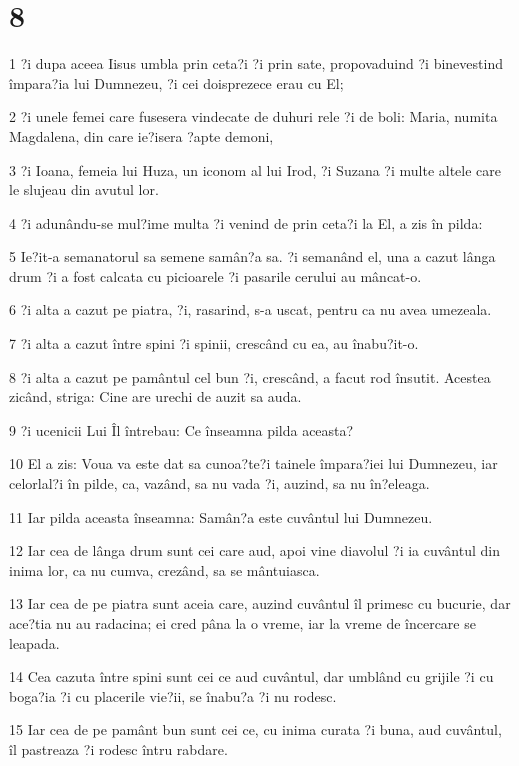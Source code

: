 \chapter{8}

\par 1 ?i dupa aceea Iisus umbla prin ceta?i ?i prin sate, propovaduind ?i binevestind împara?ia lui Dumnezeu, ?i cei doisprezece erau cu El;
\par 2 ?i unele femei care fusesera vindecate de duhuri rele ?i de boli: Maria, numita Magdalena, din care ie?isera ?apte demoni,
\par 3 ?i Ioana, femeia lui Huza, un iconom al lui Irod, ?i Suzana ?i multe altele care le slujeau din avutul lor.
\par 4 ?i adunându-se mul?ime multa ?i venind de prin ceta?i la El, a zis în pilda:
\par 5 Ie?it-a semanatorul sa semene samân?a sa. ?i semanând el, una a cazut lânga drum ?i a fost calcata cu picioarele ?i pasarile cerului au mâncat-o.
\par 6 ?i alta a cazut pe piatra, ?i, rasarind, s-a uscat, pentru ca nu avea umezeala.
\par 7 ?i alta a cazut între spini ?i spinii, crescând cu ea, au înabu?it-o.
\par 8 ?i alta a cazut pe pamântul cel bun ?i, crescând, a facut rod însutit. Acestea zicând, striga: Cine are urechi de auzit sa auda.
\par 9 ?i ucenicii Lui Îl întrebau: Ce înseamna pilda aceasta?
\par 10 El a zis: Voua va este dat sa cunoa?te?i tainele împara?iei lui Dumnezeu, iar celorlal?i în pilde, ca, vazând, sa nu vada ?i, auzind, sa nu în?eleaga.
\par 11 Iar pilda aceasta înseamna: Samân?a este cuvântul lui Dumnezeu.
\par 12 Iar cea de lânga drum sunt cei care aud, apoi vine diavolul ?i ia cuvântul din inima lor, ca nu cumva, crezând, sa se mântuiasca.
\par 13 Iar cea de pe piatra sunt aceia care, auzind cuvântul îl primesc cu bucurie, dar ace?tia nu au radacina; ei cred pâna la o vreme, iar la vreme de încercare se leapada.
\par 14 Cea cazuta între spini sunt cei ce aud cuvântul, dar umblând cu grijile ?i cu boga?ia ?i cu placerile vie?ii, se înabu?a ?i nu rodesc.
\par 15 Iar cea de pe pamânt bun sunt cei ce, cu inima curata ?i buna, aud cuvântul, îl pastreaza ?i rodesc întru rabdare.

